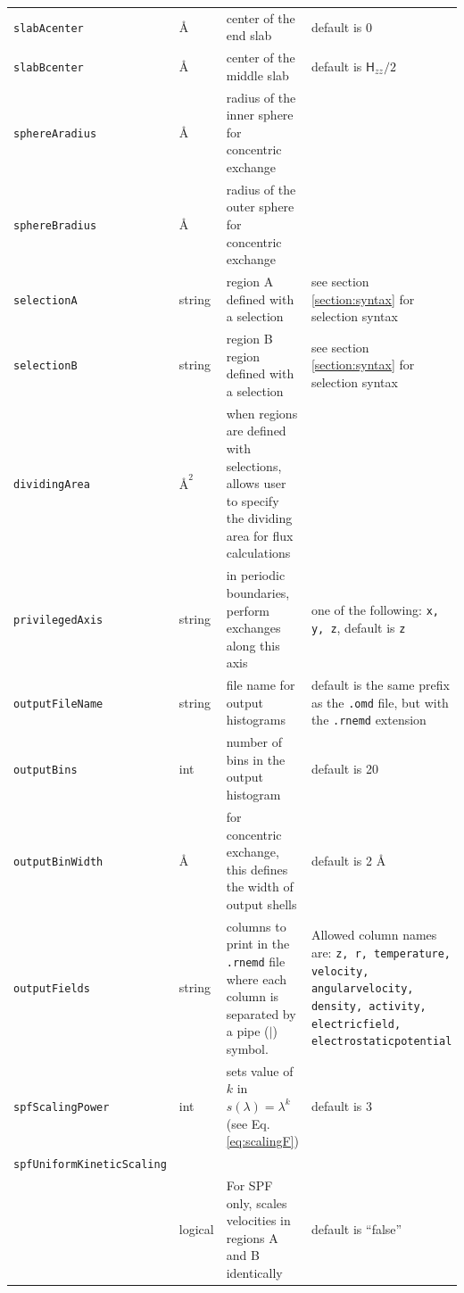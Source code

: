 \documentclass[letterpaper]{report}
\begin{document}
\begin{longtable}[c]{JKLM}
{\tt slabAcenter} & $\mbox{\AA}$ & center of the end slab & default is 0 \\
{\tt slabBcenter} & $\mbox{\AA}$ & center of the middle slab & default is $\mathsf{H}_{zz} / 2$ \\
{\tt sphereAradius} & $\mbox{\AA}$ & radius of the inner sphere for concentric exchange&  \\
{\tt sphereBradius} & $\mbox{\AA}$ & radius of the outer sphere for concentric exchange&  \\
{\tt selectionA} & string & region A defined with a selection & see section \ref{section:syntax} for selection syntax  \\
{\tt selectionB} & string & region B region defined with a selection & see section \ref{section:syntax} for selection syntax  \\
{\tt dividingArea} & $\mbox{\AA}^2$ & when regions are defined with selections, allows user to specify the dividing area for flux calculations &  \\
{\tt privilegedAxis} & string & in periodic boundaries, perform exchanges along this axis & one
of the following: {\tt x, y, z}, default is {\tt z} \\
{\tt outputFileName} & string & file name for output histograms & default is the same prefix as the
{\tt .omd} file, but with the {\tt .rnemd} extension \\
{\tt outputBins} & int & number of bins in the output histogram & default is 20 \\
{\tt outputBinWidth} & $\mbox{\AA}$ & for concentric exchange, this defines the width of output shells & default is 2 \AA \\
{\tt outputFields} & string & columns to print in the {\tt .rnemd}
file where each column is separated by a pipe ($\mid$) symbol. & Allowed column names are: {\tt z, r, temperature, velocity, angularvelocity, density, activity, electricfield, electrostaticpotential} \\
{\tt spfScalingPower} & int & sets value of $k$ in $s(\lambda) = \lambda^k$
                              (see Eq. \eqref{eq:scalingF}) & default is 3 \\
{\tt spfUniformKineticScaling} &  &  & \\
 & logical & For SPF only, scales velocities in regions A and B identically & default is ``false''
\label{table:rnemd}
\end{longtable}
\end{document}

